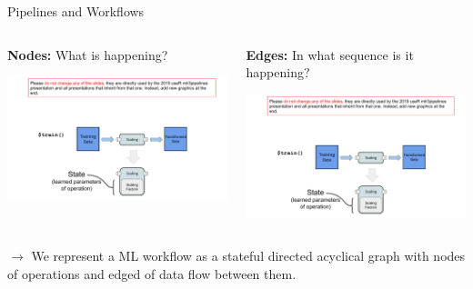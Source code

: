 	\begin{frame}{Pipelines and Workflows}
		\begin{columns}
			\begin{column}{0.5\textwidth}
				\textbf{Nodes:} What is happening? 
				\begin{center}
					\includegraphics[page=8, width=\textwidth, trim=200 0 30 190, clip]{images/mlr3Pipelines_graphics}
				\end{center}
			\end{column}%
			\begin{column}{0.5\textwidth}
				\textbf{Edges:} In what sequence is it happening? 
				\begin{center}
					\includegraphics[page=9, width=\textwidth, trim=200 0 30 190, clip]{images/mlr3Pipelines_graphics}
				\end{center}
			\end{column}
		\end{columns}
		
	\vspace{1cm}

	$\longrightarrow$ We represent a ML workflow as a stateful directed acyclical graph with nodes of operations and edged of data flow between them.

	\end{frame}

